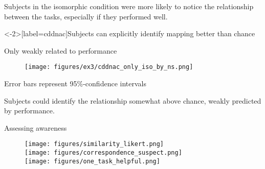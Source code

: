\documentclass{beamer}
\begin{document}
\begin{frame}[standout]
Subjects in the isomorphic condition were more likely to notice the relationship between the tasks, especially if they performed well.
\end{frame}


\begin{frame}<-2>[label=cddnac]{Subjects can explicitly identify mapping better than chance}
\begin{figure}
\centering
{}   
\end{figure}
\end{frame}

\begin{frame}{Only weakly related to performance}
\begin{figure}
\centering
    \texttt{[image: figures/ex3/cddnac\_only\_iso\_by\_ns.png]}
\end{figure}
{\scriptsize Error bars represent 95\%-confidence intervals}
\end{frame}

\begin{frame}[standout]
Subjects could identify the relationship somewhat above chance, weakly predicted by performance.
\end{frame}


\begin{frame}{Assessing awareness}
\begin{figure}
\centering
\texttt{[image: figures/similarity\_likert.png]}\\
\texttt{[image: figures/correspondence\_suspect.png]}\\
\texttt{[image: figures/one\_task\_helpful.png]}
\end{figure}
\end{frame}
\end{document}
